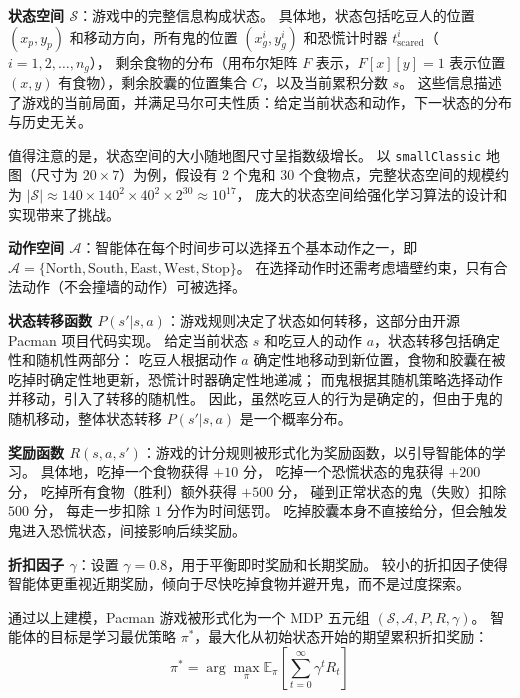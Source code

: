 \textbf{状态空间 $\mathcal{S}$}：游戏中的完整信息构成状态。
具体地，状态包括吃豆人的位置 $(x_p, y_p)$ 和移动方向，所有鬼的位置 $(x_g^i, y_g^i)$ 和恐慌计时器 $t_{\text{scared}}^i$（$i = 1, 2, \ldots, n_g$），
剩余食物的分布（用布尔矩阵 $F$ 表示，$F[x][y] = 1$ 表示位置 $(x,y)$ 有食物），剩余胶囊的位置集合 $C$，以及当前累积分数 $s$。
这些信息描述了游戏的当前局面，并满足马尔可夫性质：给定当前状态和动作，下一状态的分布与历史无关。

值得注意的是，状态空间的大小随地图尺寸呈指数级增长。
以 \texttt{smallClassic} 地图（尺寸为 $20 \times 7$）为例，假设有 2 个鬼和 30 个食物点，完整状态空间的规模约为
$|\mathcal{S}| \approx 140 \times 140^2 \times 40^2 \times 2^{30} \approx 10^{17}$，
庞大的状态空间给强化学习算法的设计和实现带来了挑战。

\textbf{动作空间 $\mathcal{A}$}：智能体在每个时间步可以选择五个基本动作之一，即
$\mathcal{A} = \{\text{North}, \text{South}, \text{East}, \text{West}, \text{Stop}\}$。
在选择动作时还需考虑墙壁约束，只有合法动作（不会撞墙的动作）可被选择。

\textbf{状态转移函数 $P(s'|s,a)$}：游戏规则决定了状态如何转移，这部分由开源 Pacman 项目代码实现。
给定当前状态 $s$ 和吃豆人的动作 $a$，状态转移包括确定性和随机性两部分：
吃豆人根据动作 $a$ 确定性地移动到新位置，食物和胶囊在被吃掉时确定性地更新，恐慌计时器确定性地递减；
而鬼根据其随机策略选择动作并移动，引入了转移的随机性。
因此，虽然吃豆人的行为是确定的，但由于鬼的随机移动，整体状态转移 $P(s'|s,a)$ 是一个概率分布。

\textbf{奖励函数 $R(s,a,s')$}：游戏的计分规则被形式化为奖励函数，以引导智能体的学习。
具体地，吃掉一个食物获得 $+10$ 分，
吃掉一个恐慌状态的鬼获得 $+200$ 分，
吃掉所有食物（胜利）额外获得 $+500$ 分，
碰到正常状态的鬼（失败）扣除 $500$ 分，
每走一步扣除 $1$ 分作为时间惩罚。
吃掉胶囊本身不直接给分，但会触发鬼进入恐慌状态，间接影响后续奖励。

\textbf{折扣因子 $\gamma$}：设置 $\gamma = 0.8$，用于平衡即时奖励和长期奖励。
较小的折扣因子使得智能体更重视近期奖励，倾向于尽快吃掉食物并避开鬼，而不是过度探索。

通过以上建模，Pacman 游戏被形式化为一个 MDP 五元组 $(\mathcal{S}, \mathcal{A}, P, R, \gamma)$。
智能体的目标是学习最优策略 $\pi^*$，最大化从初始状态开始的期望累积折扣奖励：
\begin{equation}
    \label{eq:optimal_policy}
    \pi^* = \arg\max_\pi \mathbb{E}_\pi \left[ \sum_{t=0}^\infty \gamma^t R_t \right]
\end{equation}



